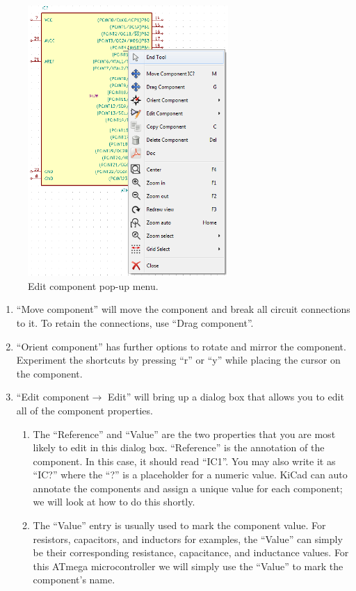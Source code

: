 \documentclass[12pt,letterpaper]{scrartcl}
\begin{document}
\begin{enumerate}
\begin{enumerate}
			\begin{figure}[h]
				\centering
				\includegraphics[width=3in]{edit-component}
				\caption{Edit component pop-up menu.}
				\label{fig:edit-component}
			\end{figure}

				\begin{enumerate}
					\item ``Move component'' will move the component and break all circuit connections to it. To retain the connections, use ``Drag component''. 
					\item ``Orient component'' has further options to rotate and mirror the component. Experiment the shortcuts by pressing ``r'' or ``y'' while placing the cursor on the component.
					\item ``Edit component$\rightarrow$ Edit'' will bring up a dialog box that allows you to edit all of the component properties. 
						\begin{enumerate}
							\item The ``Reference'' and ``Value'' are the two properties that you are most likely to edit in this dialog box. ``Reference'' is the annotation of the component. In this case, it should read ``IC1''. You may also write it as ``IC?'' where the ``?'' is a placeholder for a numeric value. KiCad can auto annotate the components and assign a unique value for each component; we will look at how to do this shortly.
							\item The ``Value'' entry is usually used to mark the component value. For resistors, capacitors, and inductors for examples, the ``Value'' can simply be their corresponding resistance, capacitance, and inductance values. For this ATmega microcontroller we will simply use the ``Value'' to mark the component’s name. 
						\end{enumerate}
				\end{enumerate}
		\end{enumerate}


\end{enumerate}
\end{document}
